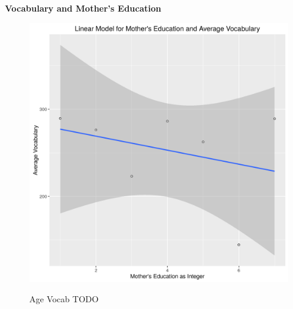 \documentclass[11pt]{article}  %
\begin{document}
\textbf{Vocabulary and Mother's Education}
\begin{figure}[h]
\centering
\caption{Age Vocab TODO}
\includegraphics[scale=.50]{means_edu}
\label{}
\end{figure}





\end{document}
